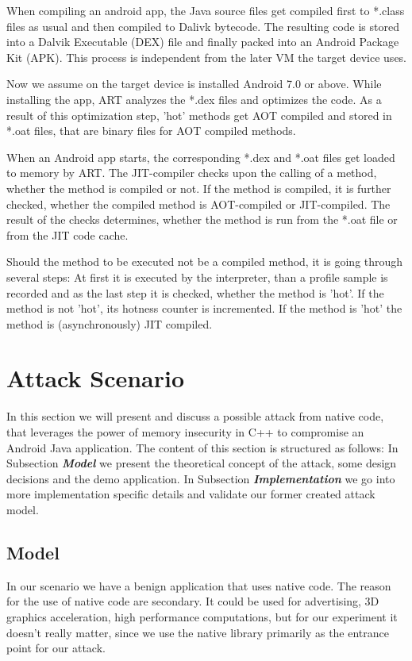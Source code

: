 When compiling an android app, the Java source files get compiled first to *.class files as usual and then compiled to Dalivk bytecode. The resulting code is stored into a  Dalvik Executable (DEX) file and finally packed into an Android Package Kit (APK). This process is independent from the later VM the target device uses.

Now we assume on the target device is installed Android 7.0 or above.
While installing the app, ART analyzes the *.dex files and optimizes the code. As a result of this optimization step, 'hot' methods get AOT compiled and stored in *.oat files, that are binary files for AOT compiled methods.


When an Android app starts, the corresponding *.dex and *.oat files get loaded to memory by ART. The JIT-compiler checks upon the calling of a method, whether the method is compiled or not. If the method is compiled, it is further checked, whether the compiled method is AOT-compiled or JIT-compiled. The result of the checks determines, whether the method is run from the *.oat file or from the JIT code cache.

Should the method to be executed not be a compiled method, it is going through several steps: At first it is executed by the interpreter, than a profile sample is recorded and as the last step it is checked, whether the method is 'hot'. If the method is not 'hot', its hotness counter is incremented. 
If the method is 'hot' the method is (asynchronously) JIT compiled. 

\section{Attack Scenario}
In this section we will present and discuss a possible attack from native code, that leverages the power of memory insecurity in C++ to compromise an Android Java application. The content of this section is structured as follows: In Subsection \emph{\textbf{Model}} we present the theoretical concept of the attack, some design decisions and the demo application. 
In Subsection \emph{\textbf{Implementation}} we go into more implementation specific details and validate our former created attack model.

\subsection{Model}

In our scenario we have a benign application that uses native code.
The reason for the use of native code are secondary. It could be used for advertising, 3D graphics acceleration, high performance computations, but for our experiment it doesn't really matter, since we use the native library primarily as the entrance point for our attack.

